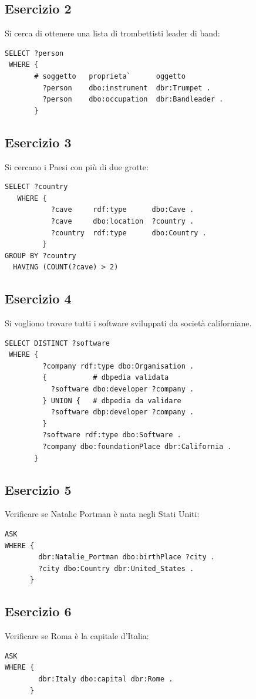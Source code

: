 \documentclass[11pt]{article}
\begin{document}
\subsection*{Esercizio 2}
Si cerca di ottenere una lista di trombettisti leader di band:
\begin{lstlisting}[language=sparql]
SELECT ?person
 WHERE {
       # soggetto   proprieta`      oggetto
         ?person    dbo:instrument  dbr:Trumpet .
         ?person    dbo:occupation  dbr:Bandleader .
       }
\end{lstlisting}

\subsection*{Esercizio 3}
Si cercano i Paesi con più di due grotte:
\begin{lstlisting}[language=sparql]
  SELECT ?country
   WHERE {
           ?cave     rdf:type      dbo:Cave .
           ?cave     dbo:location  ?country .
           ?country  rdf:type      dbo:Country .
         }
GROUP BY ?country
  HAVING (COUNT(?cave) > 2)
\end{lstlisting}

\subsection*{Esercizio 4}
Si vogliono trovare tutti i software sviluppati da società californiane.
\begin{lstlisting}[language=sparql]
SELECT DISTINCT ?software
 WHERE {
         ?company rdf:type dbo:Organisation .
         {           # dbpedia validata
           ?software dbo:developer ?company .
         } UNION {   # dbpedia da validare
           ?software dbp:developer ?company .
         }
         ?software rdf:type dbo:Software .
         ?company dbo:foundationPlace dbr:California .
       }
\end{lstlisting}

\subsection*{Esercizio 5}
Verificare se Natalie Portman è nata negli Stati Uniti:
\begin{lstlisting}[language=sparql]
  ASK
WHERE {
        dbr:Natalie_Portman dbo:birthPlace ?city .
        ?city dbo:Country dbr:United_States .
      }
\end{lstlisting}

\subsection*{Esercizio 6}
Verificare se Roma è la capitale d'Italia:
\begin{lstlisting}[language=sparql]
  ASK 
WHERE {
        dbr:Italy dbo:capital dbr:Rome .
      }
\end{lstlisting}
\end{document}
